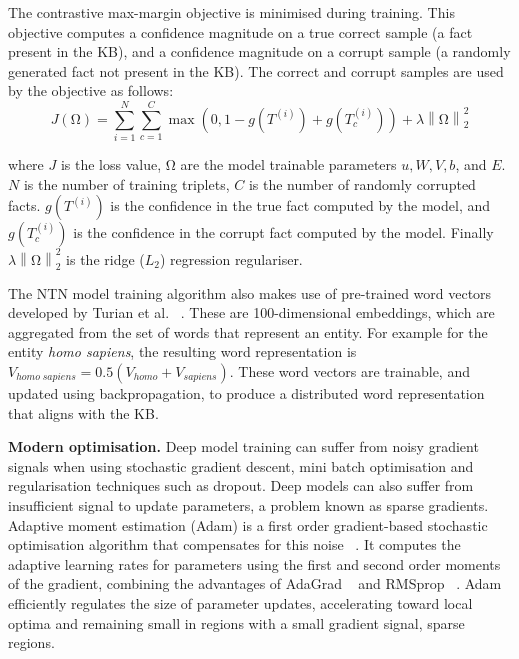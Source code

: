 \noindent The contrastive max-margin objective is minimised during training. This objective computes a confidence magnitude on a true correct sample (a fact present in the KB), and a confidence magnitude on a corrupt sample (a randomly generated fact not present in the KB). The correct and corrupt samples are used by the objective as follows:
\begin{equation}
	J(\si{\ohm}) =  \sum_{i=1}^N \sum_{c=1}^C \max(0,1 - g(T^{(i)}) + g(T_c^{(i)})) + \lambda \left \lVert \si{\ohm} \right \rVert_2^2
\end{equation}

\noindent where $J$ is the loss value, $\si{\ohm}$ are the model trainable parameters $u, W, V, b $, and $ E $. $N$ is the number of training triplets, $C$ is the number of randomly corrupted facts. $ g(T^{(i)}) $ is the confidence in the true fact computed by the model, and $ g(T_c^{(i)}) $ is the confidence in the corrupt fact computed by the model. Finally $\lambda\left\lVert \si{\ohm} \right\rVert_2^2$ is the ridge ($L_2$) regression regulariser. \par

\noindent The NTN model training algorithm also makes use of pre-trained word vectors developed by Turian et al. \unskip ~\citep{turian2010word}. These are 100-dimensional embeddings, which are aggregated from the set of words that represent an entity. For example for the entity \textit{homo sapiens}, the resulting word representation is $V_{homo \; sapiens} = 0.5(V_{homo} + V_{sapiens})$. These word vectors are trainable, and updated using backpropagation, to produce a distributed word representation that aligns with the KB. \par

\noindent \textbf{Modern optimisation.} Deep model training can suffer from noisy gradient signals when using stochastic gradient descent, mini batch optimisation and regularisation techniques such as dropout. Deep models can also suffer from insufficient signal to update parameters, a problem known as sparse gradients. Adaptive moment estimation (Adam) is a first order gradient-based stochastic optimisation algorithm that compensates for this noise \unskip ~\citep{kingma2014adam}. It computes the adaptive learning rates for parameters using the first and second order moments of the gradient, combining the advantages of AdaGrad ~\citep{duchi2011adaptive} and RMSprop ~\citep{tieleman2012lecture}. Adam efficiently regulates the size of parameter updates, accelerating toward local optima and remaining small in regions with a small gradient signal, sparse regions. \par

